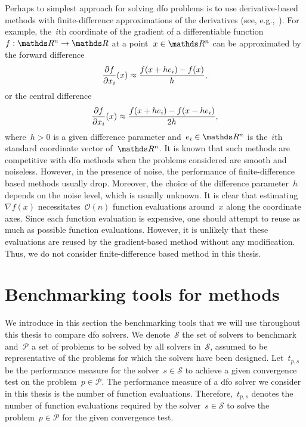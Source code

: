 Perhaps to simplest approach for solving \gls{dfo} problems is to use derivative-based methods with finite-difference approximations of the derivatives (see, e.g.,~\cite{Shi_Etal_2021}).
For example, the~$i$th coordinate of the gradient of a differentiable function~$\obj : \R^n \to \R$ at a point~$x \in \R^n$ can be approximated by the forward difference
\begin{equation*}
    \frac{\partial f}{\partial x_i}(x) \approx \frac{f(x + h e_i) - f(x)}{h},
\end{equation*}
or the central difference
\begin{equation*}
    \frac{\partial f}{\partial x_i}(x) \approx \frac{f(x + h e_i) - f(x - h e_i)}{2h},
\end{equation*}
where~$h > 0$ is a given difference parameter and~$e_i \in \R^n$ is the~$i$th standard coordinate vector of~$\R^n$.
It is known that such methods are competitive with \gls{dfo} methods when the problems considered are smooth and noiseless.
However, in the presence of noise, the performance of finite-difference based methods usually drop.
Moreover, the choice of the difference parameter~$h$ depends on the noise level, which is usually unknown.
It is clear that estimating~$\nabla f(x)$ necessitates~$\mathcal{O}(n)$ function evaluations around~$x$ along the coordinate axes.
Since each function evaluation is expensive, one should attempt to reuse as much as possible function evaluations.
However, it is unlikely that these evaluations are reused by the gradient-based method without any modification.
Thus, we do not consider finite-difference based method in this thesis.


\section{Benchmarking tools for  methods}

We introduce in this section the benchmarking tools that we will use throughout this thesis to compare \gls{dfo} solvers.
We denote~$\mathcal{S}$ the set of solvers to benchmark and~$\mathcal{P}$ a set of problems to be solved by all solvers in~$\mathcal{S}$, assumed to be representative of the problems for which the solvers have been designed.
Let~$t_{p, s}$ be the performance measure for the solver~$s \in \mathcal{S}$ to achieve a given convergence test on the problem~$p \in \mathcal{P}$.
The performance measure of a \gls{dfo} solver we consider in this thesis is the number of function evaluations.
Therefore,~$t_{p, s}$ denotes the number of function evaluations required by the solver~$s \in \mathcal{S}$ to solve the problem~$p \in \mathcal{P}$ for the given convergence test.

